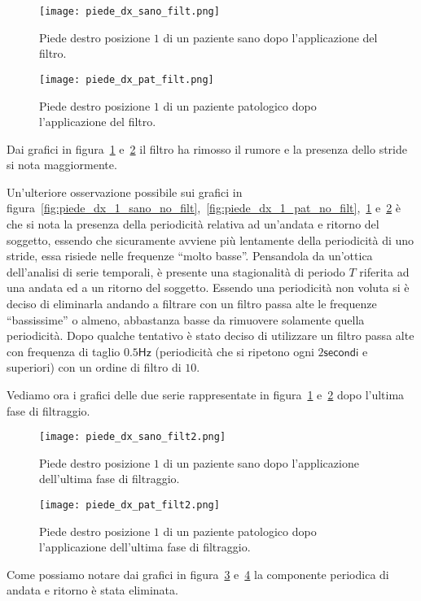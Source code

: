 \begin{figure}[H]
    \centering
    \texttt{[image: piede\_dx\_sano\_filt.png]}
    \caption{Piede destro posizione $1$ di un paziente sano dopo l'applicazione del filtro.}
    \label{fig:piede_dx_1_sano_filt}
\end{figure}

\begin{figure}[H]
    \centering
    \texttt{[image: piede\_dx\_pat\_filt.png]}
    \caption{Piede destro posizione $1$ di un paziente patologico dopo l'applicazione del filtro.}
    \label{fig:piede_dx_1_pat_filt}
\end{figure}

Dai grafici in figura~\ref{fig:piede_dx_1_sano_filt} 
e~\ref{fig:piede_dx_1_pat_filt} il filtro ha rimosso il rumore e la presenza dello stride
si nota maggiormente.

Un'ulteriore osservazione possibile sui grafici in figura~\ref{fig:piede_dx_1_sano_no_filt},~\ref{fig:piede_dx_1_pat_no_filt},~\ref{fig:piede_dx_1_sano_filt} 
e~\ref{fig:piede_dx_1_pat_filt} è che si nota la presenza della periodicità
relativa ad un'andata e ritorno del soggetto,
essendo che sicuramente avviene più lentamente della periodicità di uno stride, essa
risiede nelle frequenze ``molto basse''. Pensandola da un'ottica dell'analisi
di serie temporali, è presente una stagionalità di periodo $T$ riferita ad una andata
ed a un ritorno del soggetto. Essendo una periodicità non voluta si è deciso di eliminarla
andando a filtrare con un filtro passa alte le frequenze ``bassissime'' o almeno,
abbastanza basse da rimuovere solamente quella periodicità. Dopo qualche tentativo
è stato deciso di utilizzare un filtro passa alte con frequenza di taglio $0.5\mathsf{Hz}$
(periodicità che si ripetono ogni $2\mathsf{secondi}$ e superiori) con un ordine di filtro di $10$.

Vediamo ora i grafici delle due serie rappresentate in figura~\ref{fig:piede_dx_1_sano_filt} 
e~\ref{fig:piede_dx_1_pat_filt} dopo l'ultima fase di filtraggio.

\begin{figure}[H]
    \centering
    \texttt{[image: piede\_dx\_sano\_filt2.png]}
    \caption{Piede destro posizione $1$ di un paziente sano dopo l'applicazione dell'ultima fase di filtraggio.}
    \label{fig:piede_dx_1_sano_filt2}
\end{figure}

\begin{figure}[H]
    \centering
    \texttt{[image: piede\_dx\_pat\_filt2.png]}
    \caption{Piede destro posizione $1$ di un paziente patologico dopo l'applicazione dell'ultima fase di filtraggio.}
    \label{fig:piede_dx_1_pat_filt2}
\end{figure}

Come possiamo notare dai grafici in figura~\ref*{fig:piede_dx_1_sano_filt2} e~\ref*{fig:piede_dx_1_pat_filt2}
la componente periodica di andata e ritorno è stata eliminata.